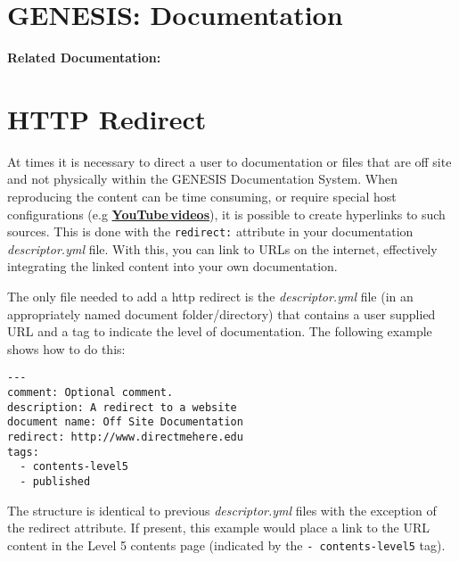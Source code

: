 \documentclass[12pt]{article}
\begin{document}
\section*{GENESIS: Documentation}

{\bf Related Documentation:}

\section*{HTTP Redirect}

At times it is necessary to direct a user to documentation or files that are off site and not physically within the GENESIS Documentation System. When reproducing the content can be time consuming, or require special host configurations (e.g \href{http://www.youtube.com/user/genesissim}{\bf YouTube\,videos}), it is possible to create hyperlinks to such sources. This is done with the {\tt redirect:} attribute in your documentation {\it descriptor.yml} file. With this, you can link to URLs on the internet, effectively integrating the linked content into your own documentation.

The only file needed to add a http redirect is the {\it descriptor.yml} file (in an appropriately named document folder/directory) that contains a user supplied URL and a tag to indicate the level of documentation. The following example shows how to do this:
\begin{verbatim}
---
comment: Optional comment.
description: A redirect to a website
document name: Off Site Documentation
redirect: http://www.directmehere.edu
tags:
  - contents-level5
  - published
\end{verbatim}
The structure is identical to previous {\it descriptor.yml} files with the exception of the redirect attribute. If present, this example would place a link to the URL content in the Level 5 contents page (indicated by the {\tt -\,contents-level5} tag).
\end{document}
